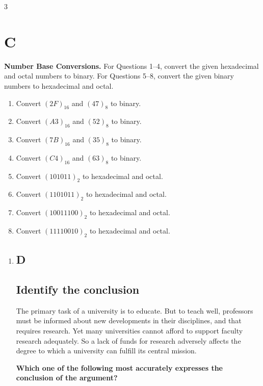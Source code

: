 \documentclass[9pt]{article}
\begin{document}
\begin{multicols}{3}
\section*{C}

\textbf{Number Base Conversions.} 
For Questions 1–4, convert the given hexadecimal and octal numbers to binary.  
For Questions 5–8, convert the given binary numbers to hexadecimal and octal.

\begin{enumerate}
    \item Convert $(2F)_{16}$ and $(47)_8$ to binary.
    \item Convert $(A3)_{16}$ and $(52)_8$ to binary.
    \item Convert $(7B)_{16}$ and $(35)_8$ to binary.
    \item Convert $(C4)_{16}$ and $(63)_8$ to binary.

    \item Convert $(101011)_2$ to hexadecimal and octal.
    \item Convert $(1101011)_2$ to hexadecimal and octal.
    \item Convert $(10011100)_2$ to hexadecimal and octal.
    \item Convert $(11110010)_2$ to hexadecimal and octal.
\end{enumerate}



\begin{enumerate}
\item

\subsection*{D}
\subsection*{Identify the conclusion}

\noindent
The primary task of a university is to educate. But to teach well, professors must be informed about new developments in their disciplines, and that requires research. Yet many universities cannot afford to support faculty research adequately. So a lack of funds for research adversely affects the degree to which a university can fulfill its central mission.

 
\noindent

\textbf{Which one of the following most accurately expresses the conclusion of the argument?}


\end{enumerate}
\end{multicols}
\end{document}
